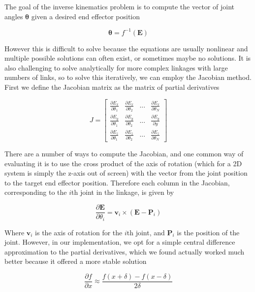 \documentclass[paper=a4, fontsize=11pt]{scrartcl} %
\numberwithin{equation}{section} %
\numberwithin{figure}{section} %
\numberwithin{table}{section} %
\newcommand{\vect}[1]{\mathbf{#1}}
\newcommand{\params}{\boldsymbol{\theta}}
\newcommand{\dn}[1]{\partial{#1}}
\begin{document}
The goal of the inverse kinematics problem is to compute the vector of joint angles $\params$ given a desired end effector position

\begin{equation}
\params = f^{-1}(\vect{E})
\end{equation}

However this is difficult to solve because the equations are usually nonlinear and multiple possible solutions can often exist, or sometimes maybe no solutions. It is also challenging to solve analytically for more complex linkages with large numbers of links, so to solve this iteratively, we can employ the Jacobian method. First we define the Jacobian matrix as the matrix of partial derivatives

\begin{equation}
J = \left[
\begin{array}{cccc}
\frac{\dn{E_x}}{\dn{\theta_1}} & \frac{\dn{E_x}}{\dn{\theta_2}} & ... & \frac{\dn{E_x}}{\dn{\theta_N}} 
\\[0.2cm]
\frac{\dn{E_y}}{\dn{\theta_1}} & \frac{\dn{E_y}}{\dn{\theta_2}} & ... & \frac{\dn{E_y}}{\dn{y}} 
\\[0.2cm]
\frac{\dn{E_z}}{\dn{\theta_1}} & \frac{\dn{E_z}}{\dn{\theta_2}} & ... & \frac{\dn{E_z}}{\dn{\theta_N}}
\end{array}
\right]
\end{equation}

There are a number of ways to compute the Jacobian, and one common way of evaluating it is to use the cross product of the axis of rotation (which for a 2D system is simply the z-axis out of screen) with the vector from the joint position to the target end effector position. Therefore each column in the Jacobian, corresponding to the $i$th joint in the linkage, is given by

\begin{equation}
\frac{\dn{\vect{E}}}{\dn{\theta_i}} = \vect{v}_i \times (\vect{E} - \vect{P}_i)
\end{equation}

Where $\vect{v}_i$ is the axis of rotation for the $i$th joint, and $\vect{P}_i$ is the position of the joint. However, in our implementation, we opt for a simple central difference approximation to the partial derivatives, which we found actually worked much better because it offered a more stable solution

\begin{equation}
\frac{\dn{f}}{\dn{x}} \approx \frac{f(x+\delta) - f(x-\delta)}{2\delta} 
\end{equation}
 
\end{document}
